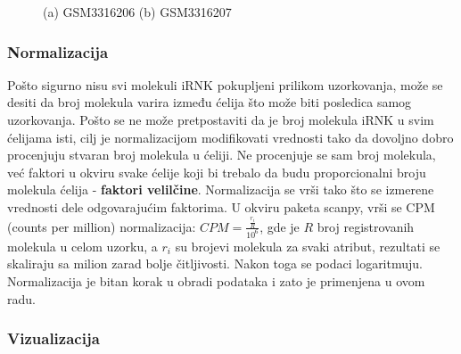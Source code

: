 \documentclass{article}
\begin{document}
\begin{figure}[!h]
    \centering
    \caption{ (a) GSM3316206 (b) GSM3316207 }
    \label{fig:genes_counts_filtered_group_2}
\end{figure}

\subsubsection{Normalizacija}

Pošto sigurno nisu svi molekuli iRNK pokupljeni prilikom uzorkovanja, može se desiti da broj molekula varira između ćelija što može biti posledica samog uzorkovanja. Pošto se ne može pretpostaviti da je broj molekula iRNK u svim ćelijama isti, cilj je normalizacijom modifikovati vrednosti tako da dovoljno dobro procenjuju stvaran broj molekula u ćeliji. Ne procenjuje se sam broj molekula, već faktori u okviru svake ćelije koji bi trebalo da budu proporcionalni broju molekula ćelija - \textbf{faktori velilčine}. Normalizacija se vrši tako što se izmerene vrednosti dele odgovarajućim faktorima. U okviru paketa scanpy, vrši se CPM (counts per million) normalizacija: $CPM = \frac{\frac{r_i}{R}}{10^6}$, gde je $R$ broj registrovanih molekula u celom uzorku, a $r_i$ su brojevi molekula za svaki atribut, rezultati se skaliraju sa milion zarad bolje čitljivosti. Nakon toga se podaci logaritmuju. Normalizacija je bitan korak u obradi podataka\cite{luecken2019current, long2019cluster} i zato je primenjena u ovom radu.

\subsubsection{Vizualizacija}
\end{document}

